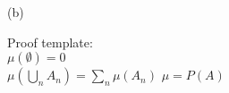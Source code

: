 (b)

Proof template:\\
$ \mu(\emptyset) = 0 $\\
$ \mu(\bigcup_n{A_n}) = \sum_n{\mu(A_n)} $
$ \mu = P(A) $